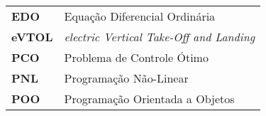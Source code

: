 \begin{longtable}{ll}
    \textbf{EDO} & Equação Diferencial Ordinária \\
    \textbf{eVTOL} & \textit{electric Vertical Take-Off and Landing} \\
    \textbf{PCO} & Problema de Controle Ótimo \\
    \textbf{PNL} & Programação Não-Linear \\
    \textbf{POO} & Programação Orientada a Objetos \\
\end{longtable}


